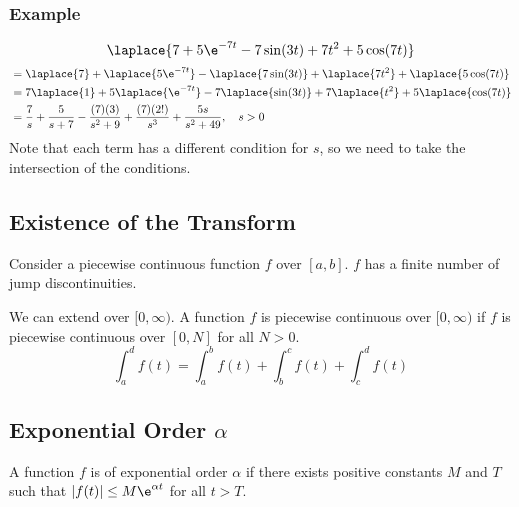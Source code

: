 \documentclass{math}
\begin{document}
\subsubsection*{Example}
\[ \laplace{7+5\e^{-7t}-7\sin(3t)+7t^2+5\cos(7t)} \]
\begin{align*}
  &= \laplace{7}+\laplace{5\e^{-7t}}-\laplace{7\sin(3t)}+\laplace{7t^2}+
    \laplace{5\cos(7t)} \\
  &= 7\laplace{1}+5\laplace{\e^{-7t}}-7\laplace{\sin(3t)}+7\laplace{t^2}+
    5\laplace{\cos(7t)} \\
  &= \frac{7}{s}+\frac{5}{s+7}-\frac{(7)(3)}{s^2+9}+\frac{(7)(2!)}{s^3}+
    \frac{5s}{s^2+49}, \quad s>0
\end{align*}
Note that each term has a different condition for \( s \), so we need to take
the intersection of the conditions.

\subsection*{Existence of the Transform}
Consider a piecewise continuous function \( f \) over \( [a,b] \). \( f \) has
a finite number of jump discontinuities.
\begin{center}
\end{center}
We can extend over \( [0,\infty) \). A function \( f \) is piecewise continuous
over \( [0,\infty) \) if \( f \) is piecewise continuous over \( [0,N] \) for
all \( N > 0 \).
\[ \int_{a}^{d}f(t) = \int_{a}^{b}f(t)+\int_{b}^{c}f(t)+\int_{c}^{d}f(t) \]

\subsection*{Exponential Order \( \alpha \)}
A function \( f \) is of exponential order \( \alpha \) if there exists
positive constants \( M \) and \( T \) such that \( |f(t)|\le M\e^{\alpha t} \)
for all \( t > T \).
\end{document}

